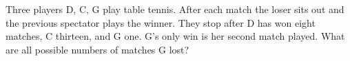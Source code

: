 Three players D, C, G play table tennis. After each match the loser sits out and the previous spectator plays the winner. They stop after D has won eight matches, C thirteen, and G one. G's only win is her second match played. What are all possible numbers of matches G lost?
